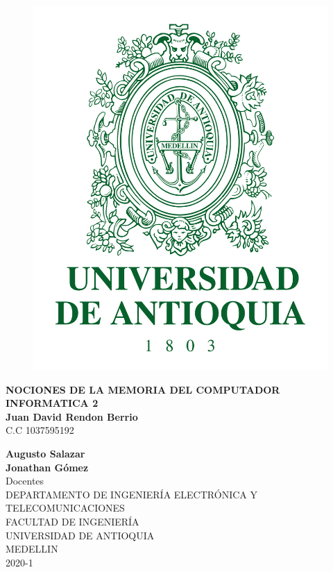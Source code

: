 \documentclass[10pt,letterpaper]{article}
\begin{document}
	
	\pagestyle{empty}
	
	\begin{figure}[h]
		\centering
		\includegraphics[scale=0.12]{images/escudoUdeA.png}
	\end{figure}
	
	\centering
	
	\textbf{\Large{NOCIONES DE LA MEMORIA DEL COMPUTADOR}}\\
	\vspace{1cm}
	\textbf{\Large{INFORMATICA 2}}\\
	\large
	\vspace{1.4cm}
	\textbf{Juan David Rendon Berrio}\\\vspace{0.1cm}C.C 1037595192 \\\vspace{1cm}      
	
	\textbf{Augusto Salazar}\\
	\vspace{0.2cm}
	\textbf{Jonathan Gómez}\\
	\vspace{0.2cm}
	\Large{Docentes}\\
	\vspace{1cm}
	\vfill
	\large{DEPARTAMENTO DE INGENIERÍA ELECTRÓNICA Y TELECOMUNICACIONES}\\
	\vspace{0.3cm}
	\large{FACULTAD DE INGENIERÍA}\\
	\large{UNIVERSIDAD DE ANTIOQUIA}\\
	\vspace{0.3cm}
	\large{MEDELLIN}\\
	\large{2020-1}\\
\end{document}
